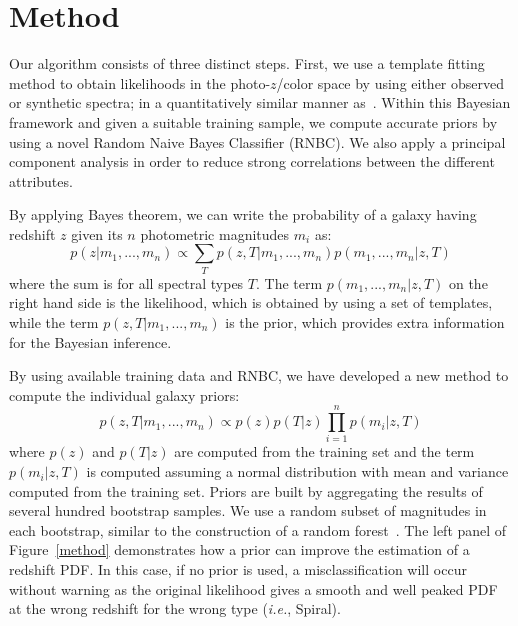 \documentclass[11pt,twoside]{article}
\begin{document}
\section{Method}

Our algorithm consists of three distinct steps. First, we use a template fitting method to obtain likelihoods in the photo-$z$/color space by using either observed or synthetic spectra; in a quantitatively similar manner as~\cite{Benitez2000}. Within this Bayesian framework and given a suitable training sample, we compute accurate priors by using a novel Random Naive Bayes Classifier (RNBC). We also apply a principal component analysis in order to reduce strong correlations between the different attributes. 

By applying Bayes theorem, we can write the probability of a galaxy having redshift $z$ given its $n$ photometric magnitudes $m_i$ as:
\begin{equation}\label{bayes}
p(z|m_1,...,m_n) \propto \sum_T p(z,T|m_1,...,m_n)p(m_1,...,m_n|z,T)
\end{equation}
where the sum is for all spectral types $T$. The term $p(m_1,...,m_n|z,T)$ on the right hand side is the likelihood, which is obtained by using a set of templates, while the term $p(z,T|m_1,...,m_n)$ is the prior, which provides extra information for the Bayesian inference. 

By using available training data and RNBC, we have developed a new method to compute the individual galaxy priors:
\begin{equation}\label{prior}
 p(z,T|m_1,...,m_n) \propto p(z)p(T|z)\prod_{i=1}^{n} p(m_i|z,T)
\end{equation}
where $p(z)$ and $p(T|z)$ are computed from the training set and the term $p(m_i|z,T)$ is computed assuming a normal distribution with mean and variance computed from the training set. Priors are built by aggregating the results of several hundred bootstrap samples. We use a random subset of magnitudes in each bootstrap, similar to the construction of a random forest~\citep{Breiman2001}. The left panel of Figure~\ref{method}  demonstrates how a prior can improve the estimation of a redshift PDF. In this case, if no prior is used, a misclassification will occur without warning as the original likelihood gives a smooth and well peaked PDF at the wrong redshift for the wrong type (\textit{i.e.}, Spiral).
\end{document}
